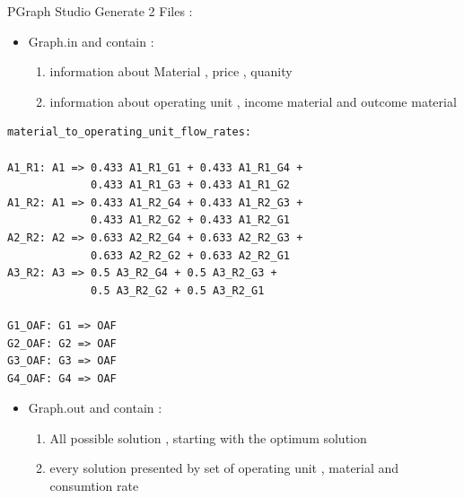 PGraph Studio Generate 2 Files : 
\begin{itemize}
	\item Graph.in and contain :
		\begin{enumerate}
			\item information about Material , price , quanity
			\item information about operating unit , income material and outcome material 
 	\end{enumerate}

\end{itemize}

\begin{lstlisting}[caption=Part from Graph.in]
material_to_operating_unit_flow_rates:

A1_R1: A1 => 0.433 A1_R1_G1 + 0.433 A1_R1_G4 +
			 0.433 A1_R1_G3 + 0.433 A1_R1_G2
A1_R2: A1 => 0.433 A1_R2_G4 + 0.433 A1_R2_G3 + 
			 0.433 A1_R2_G2 + 0.433 A1_R2_G1
A2_R2: A2 => 0.633 A2_R2_G4 + 0.633 A2_R2_G3 + 
			 0.633 A2_R2_G2 + 0.633 A2_R2_G1
A3_R2: A3 => 0.5 A3_R2_G4 + 0.5 A3_R2_G3 + 
			 0.5 A3_R2_G2 + 0.5 A3_R2_G1
			 
G1_OAF: G1 => OAF
G2_OAF: G2 => OAF
G3_OAF: G3 => OAF
G4_OAF: G4 => OAF

\end{lstlisting}



\begin{itemize}
	\item Graph.out and contain :
		\begin{enumerate}
			\item All possible solution , starting with the optimum solution 
			\item every solution presented by set of  operating unit , material and consumtion rate  
 	\end{enumerate}

\end{itemize}



